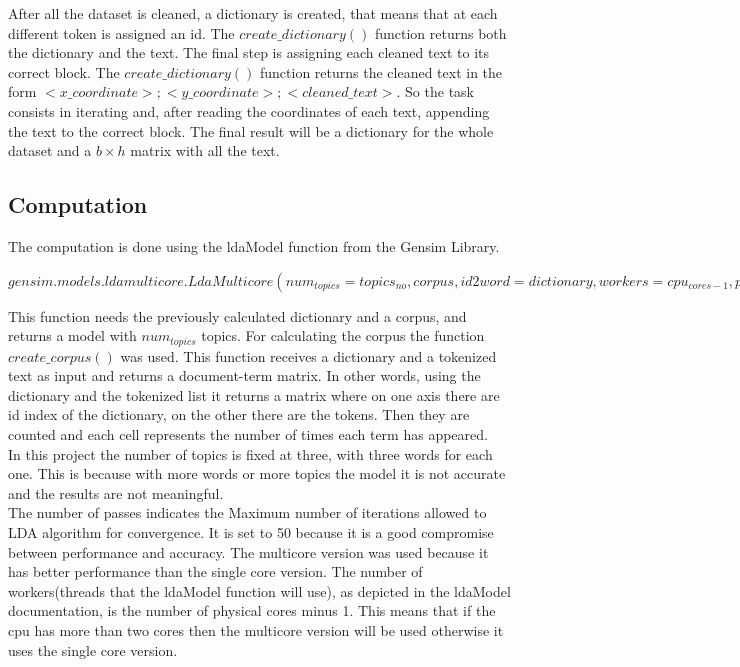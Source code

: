 \documentclass{sig-alternate-05-2015}
\begin{document}
After all the dataset is cleaned, a dictionary is created, that means that at each different token is assigned an id.\newline
The $create\_dictionary()$ function returns both the dictionary and the text.
The final step is assigning each cleaned text to its correct block. The $create\_dictionary()$ function returns the cleaned text in the form $<x\_coordinate>;<y\_coordinate>; <cleaned\_text>$. So the task consists in iterating and, after reading the coordinates of each text, appending the text to the correct block.
The final result will be a dictionary for the whole dataset and a $b\times h$ matrix with all the text.

\subsection{Computation}\label{cmpt}
The computation is done using the ldaModel function from the Gensim Library.\\
\begin{center}
$gensim.models.ldamulticore.LdaMulticore(
num_{topics}=topics_{no}, corpus, id2word=dictionary,workers = cpu_{cores-1},  passes=50)$
\end{center}
This function needs the previously calculated dictionary and a corpus, and returns a model with $num_{topics}$ topics.
For calculating the corpus the function $create\_corpus()$ was used. This function receives a dictionary and a tokenized text as input and returns a document-term matrix. In other words, using the dictionary and the tokenized list it returns a matrix where on one axis there are id index of the dictionary, on the other there are the tokens. Then they are counted and each cell represents the number of times each term has appeared.\\
In this project the number of topics is fixed at three, with three words for each one. This is because with more words or more topics the model it is not accurate and the results are not meaningful.\\
The number of passes indicates the Maximum number of iterations allowed to LDA algorithm for convergence. It is set to 50 because it is a good compromise between performance and  accuracy.
The multicore version was used because it has better performance than the single core version. The number of workers(threads that the ldaModel function will use), as depicted in the ldaModel documentation, is the number of physical cores minus 1. This means that if the cpu has more than two cores then the multicore version will be used otherwise it uses the single core version.
\end{document}
